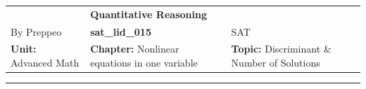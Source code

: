 \documentclass[11pt,paper=a4,answers]{exam}
\begin{document}
\begin{center}
    \centering
    \renewcommand{\arraystretch}{1.5}
    \begin{tabularx}{\textwidth}{YYY}
    & \normalsize\bf{{\Large{{Quantitative Reasoning}}}} & \\
    By Preppeo & \normalsize\bf{{sat\_lid\_015}} & SAT\\
    \normalsize{{\textbf{{Unit:}} Advanced Math}} & \normalsize{{\textbf{{Chapter:}} Nonlinear equations in one variable}} & \normalsize{{\textbf{{Topic:}} Discriminant \& Number of Solutions}} \\
    \end{tabularx}
\end{center}
\par\noindent\rule{\textwidth}{1pt}
\end{document}
